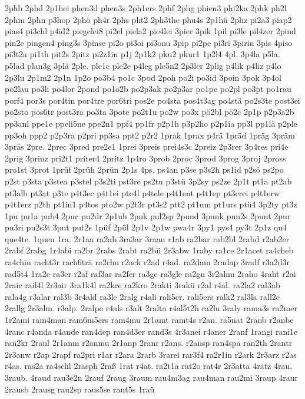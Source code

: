 {2phb
2phd
2p1hei
phen3d
phen3s
2ph1ers
2phf
2phg
phien3
phi2ka
2phk
ph2l
2phm
2phn
p3hop
2phö
ph4r
2phs
pht2
2ph3the
phu4s
2p1hü
2phz
pi2a3
piap2
pias4
pi3chl
p4id2
piegelei8
pi2el
piela2
pie4lei
3pier
3pik
1pil
pi3le
pil4zer
2pind
pin2e
pingen4
ping3s
3pinse
pi2o
pi3oi
pi3onu
3pip
pi2pe
pi3ri
3pirin
3pis
4piso
pi3t2a
pi1th
pit2s
2pitz
pi2z1in
p1j
2p1k2
pku2
pkur1
1p2l4
4pl.
3p4la
p5la.
p5lad
plan3g
3plä
2ple.
ple1c
ple2e
p4leg
ple5n2
2p3ler
2plig
p4lik
p4liz
p4lo
2p3lu
2p1m2
2p1n
1p2o
po3b4
po1c
3pod
2poh
po2i
po3id
3poin
3pok
3p4ol
po2lau
po3li
po4lor
2pond
po1o2b
po2p3ak
po2p3ar
po1pe
po2pl
po3pt
po1rau
porf4
por3s
por4tin
por4tre
por6tri
pos2e
po4sta
pos4t3ag
po4stä
po2s3te
post3ei
po2sto
pos6tr
post3ra
po3ta
3pote
po2t1u
po2w
po3x
pö2bl
pö2c
2p1p
p2p3a2b
pp3anl
ppe1e
ppeli5ne
ppe2n1
ppf4
pp1fr
p2p1h
p3p2ho
p2p1ia
pp3l
pp1lä
p2ple
pp3oh
ppp2
p2p3ra
p2pri
pp3sa
ppt2
p2r2
1prak
1prax
p4rä
1präd
1präg
3präm
3präs
2pre.
2prec
3pred
pre2e1
1prei
3preis
prei4s3c
2preiz
2p3rer
3p4res
pri4e
2prig
3prinz
pri2t1
priter4
2pritz
1p4ro
3prob
2proc
3prod
3prog
3proj
2pross
pro1st
3prot
1prüf
2prüh
2prün
2p1s
4ps.
ps4an
p3se
p3s2h
ps1id
p2sö
ps2po
p2st
p3sta
p3stea
p3stel
p3s2ti
pst3re
ps2tu
p3stü
3p2sy
ps2ze
2p1t
pt1a
pt2ab
pt3alb
pt3at
p3te
p4t3ec
p4t1ei
pte4l
p4tele
p4t1ent
p4t1ep
pt3erei
p4t1erw
p4t1erz
p2th
pt1in1
p4tos
pto2w
p2t3r
pt3s2
ptt2
pt1um
pt1urs
ptü4
3p2ty
pt3z
1pu
pu1a
pub4
2puc
pu2dr
2p1uh
2puk
pul2sp
2pund
3punk
pun2s
2punt
2pur
pu3ri
pu2s3t
3put
put2s
1püf
2pül
2p1v
2p1w
pwa4r
3py1
pys4
py3t
2p1z
qu4
que4te.
1queu
1ra.
2r1aa
ra2ab
3ra3ar
3raau
r1ab
ra2bar
rab2bl
2rabd
r2ab2er
2rabf
2rabg
1r4abi
ra2br
2rabs
2rabt
ra2bü
2r3abw
1raby
ra1ce
2r1acet
ra4cheb
ra4chin
racht3r
rach6trä
ra2chu
r2ack
r2ad
r4ad.
ra2dam
2radap
3radf
r3a2d3r
rad5t4
1ra2e
ra3er
r2af
raf3ar
ra2fer
ra3ge
ra3gle
ra2gn
3r2ahm
2raho
4raht
r2ai
2raic
rail4l
2r3air
3ra1k4l
ra2kre
ra2kro
2rakti
3rakü
r2al
r4al.
ra2la2
ral3ab
rala4g
r3alar
ral3b
3r4ald
ra3le
2ralg
r4ali
rali5er.
rali5ers
ralk2
ral3la
rall2e
2rallg
2r3alm.
r3alp.
2ralpe
r4als
r3alt
2ralta
r4al5t2h
ra2lu
3raly
rama3s
ra2mer
1r2ami
ram4man
ram6m5ers
ram4mu
2r1amt
ramt4s
r2an.
ra5nat
2ranb
r2anbe
4ranc
r4anda
r4ande
ran4dep
ran4d3er
rand3s
4r3anei
r4aner
2ranf
1rangi
rani1e
ran2kr
2ranl
2r1anm
r2anmu
2r1anp
2ranr
r2ans.
r2ansp
ran4spa
ran2th
2rantr
2r3anw
r2ap
2rapf
ra2pri
r1ar
r2ara
2rarb
3rarei
rar3f4
ra2r1in
r2ark
2r3arz
r2as
r4as.
ras2a
ra4schl
2rasph
2raß
1rat
r4at.
ra2t1a
rat2o
rat4r
2r3atta
4ratz
4rau.
3raub.
4raud
rau3e2n
2rauf
2raug
3raum
rau4m3ag
rau4man
rau2mi
3raup
4raur
2rausb
2rausg
rau2sp
raus5se
raut5s
1raü
}
